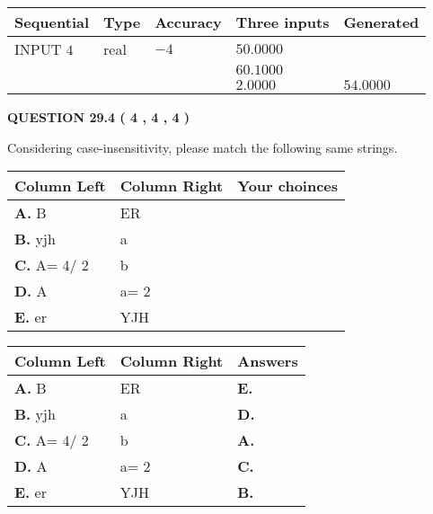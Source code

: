 \documentclass[12pt]{article}
\begin{document}
   
  
  
\noindent\begin{tabular}{|l|l|l|l|l|}
\hline
 Sequential & Type & Accuracy & Three inputs & Generated \\ 
\hline
 
 
  INPUT $            4 $ & real & $           -4  $ & $
 50.0000
  $ & \\
  & & &  $
 60.1000
  $ & \\
  & & &  $
 2.0000
 $ & $ 54.0000 $ 
 \\  \hline  
 \end{tabular}
   
   
  
\vspace{0.2in}
  
{\textbf{\Large{QUESTION
29.4 
 (           4 ,           4 ,           4 )
}}}
  
  
Considering case-insensitivity, please match the following same strings.
  
  
\begin{tabular}{|l|l|l|}
 \hline
 Column Left & Column Right  & Your choinces \\ 
 \hline
{\textbf{\large{
A.}}}
B
  & 
ER
 & 
 \\ 
 \hline
{\textbf{\large{
B.}}}
yjh
  & 
a
 & 
 \\ 
 \hline
{\textbf{\large{
C.}}}
 A= %
4/ %
2

  & 
b
 & 
 \\ 
 \hline
{\textbf{\large{
D.}}}
A
  & 
 a= %
2
 & 
 \\ 
 \hline
{\textbf{\large{
E.}}}
er
  & 
YJH
 & 
 \\ 
 \hline
 \end{tabular}
  
  
 
 
\noindent{}
  
  
\begin{tabular}{|l|l|l|}
 \hline
 Column Left & Column Right  & Answers       \\ 
 \hline
{\textbf{\large{
A.}}}
B
  & 
ER
 & 
{\textbf{\large{
E.}}}
 \\ 
 \hline
{\textbf{\large{
B.}}}
yjh
  & 
a
 & 
{\textbf{\large{
D.}}}
 \\ 
 \hline
{\textbf{\large{
C.}}}
 A= %
4/ %
2

  & 
b
 & 
{\textbf{\large{
A.}}}
 \\ 
 \hline
{\textbf{\large{
D.}}}
A
  & 
 a= %
2
 & 
{\textbf{\large{
C.}}}
 \\ 
 \hline
{\textbf{\large{
E.}}}
er
  & 
YJH
 & 
{\textbf{\large{
B.}}}
 \\ 
 \hline
 \end{tabular}
  
\end{document}
